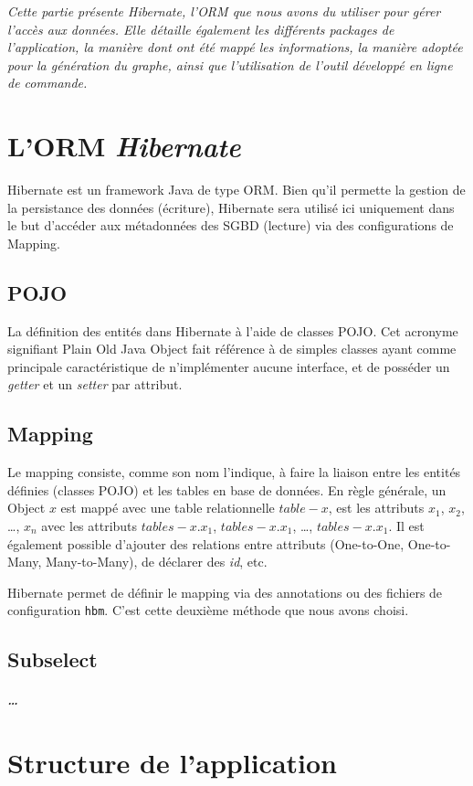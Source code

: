 \textit{Cette partie présente \emph{Hibernate}, l'ORM que nous avons du utiliser pour gérer l'accès aux données. Elle détaille également les différents packages de l'application, la manière dont ont été mappé les informations, la manière adoptée pour la génération du graphe, ainsi que l'utilisation de l'outil développé en ligne de commande.}

\section{L'ORM \emph{Hibernate}}
Hibernate est un framework Java de type ORM. Bien qu'il permette la gestion de la persistance des données (écriture), Hibernate sera utilisé ici uniquement dans le but d'accéder aux métadonnées des SGBD (lecture) via des configurations de Mapping.
\subsection{POJO}
La définition des entités dans Hibernate à l'aide de classes POJO. Cet acronyme signifiant \og Plain Old Java Object \fg{} fait référence à de simples classes ayant comme principale caractéristique de n'implémenter aucune interface, et de posséder un \emph{getter} et un \emph{setter} par attribut.
\subsection{Mapping}
Le mapping consiste, comme son nom l'indique, à faire la liaison entre les entités définies (classes POJO) et les tables en base de données. En règle générale, un Object $x$ est mappé avec une table relationnelle $table-x$, est les attributs $x_1$, $x_2$, \ldots, $x_n$ avec les attributs $tables-x.x_1$, $tables-x.x_1$, \ldots, $tables-x.x_1$. Il est également possible d'ajouter des relations entre attributs (One-to-One, One-to-Many, Many-to-Many), de déclarer des \emph{id}, etc.

Hibernate permet de définir le mapping via des annotations ou des fichiers de configuration \texttt{hbm}. C'est cette deuxième méthode que nous avons choisi.
\subsection{Subselect}
\subparagraph{\ldots}

\section{Structure de l'application}
